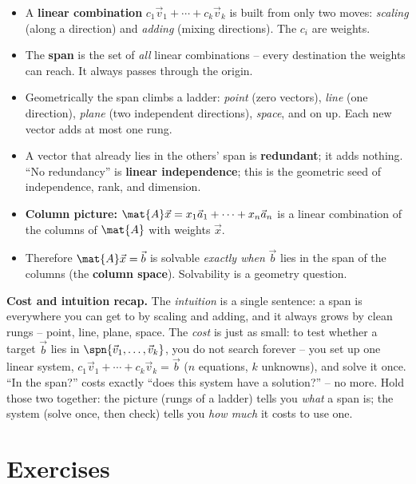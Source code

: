 \begin{itemize}
  \item A \textbf{linear combination} $c_1\vec{v}_1 + \cdots + c_k\vec{v}_k$ is built from only two moves: \emph{scaling} (along a direction) and \emph{adding} (mixing directions). The $c_i$ are weights.
  \item The \textbf{span} is the set of \emph{all} linear combinations -- every destination the weights can reach. It always passes through the origin.
  \item Geometrically the span climbs a ladder: \emph{point} (zero vectors), \emph{line} (one direction), \emph{plane} (two independent directions), \emph{space}, and on up. Each new vector adds at most one rung.
  \item A vector that already lies in the others' span is \textbf{redundant}; it adds nothing. ``No redundancy'' is \textbf{linear independence}; this is the geometric seed of independence, rank, and dimension.
  \item \textbf{Column picture:} $\mat{A}\vec{x} = x_1\vec{a}_1 + \cdots + x_n\vec{a}_n$ is a linear combination of the columns of $\mat{A}$ with weights $\vec{x}$.
  \item Therefore $\mat{A}\vec{x}=\vec{b}$ is solvable \emph{exactly when} $\vec{b}$ lies in the span of the columns (the \textbf{column space}). Solvability is a geometry question.
\end{itemize}

\begin{recoverybox}
\textbf{Cost and intuition recap.} The \emph{intuition} is a single sentence: a span is everywhere you can get to by scaling and adding, and it always grows by clean rungs -- point, line, plane, space. The \emph{cost} is just as small: to test whether a target $\vec{b}$ lies in $\spn\{\vec{v}_1,\dots,\vec{v}_k\}$, you do not search forever -- you set up one linear system, $c_1\vec{v}_1+\cdots+c_k\vec{v}_k=\vec{b}$ ($n$ equations, $k$ unknowns), and solve it once. ``In the span?'' costs exactly ``does this system have a solution?'' -- no more. Hold those two together: the picture (rungs of a ladder) tells you \emph{what} a span is; the system (solve once, then check) tells you \emph{how much} it costs to use one.
\end{recoverybox}

\section{Exercises}

